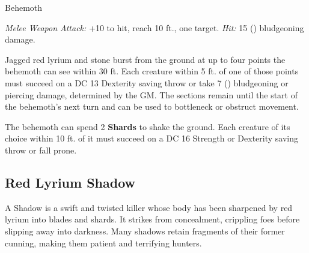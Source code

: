 \begin{monsterbox}{Behemoth}

\begin{rpg-monsteraction}[Bash]
\textit{Melee Weapon Attack:} +10 to hit, reach 10 ft., one target. \textit{Hit:} 15 () bludgeoning damage.
\end{rpg-monsteraction}

\begin{rpg-monsteraction}
Jagged red lyrium and stone burst from the ground at up to four points the behemoth can see within 30 ft. Each creature within 5 ft. of one of those points must succeed on a DC 13 Dexterity saving throw or take 7 () bludgeoning or piercing damage, determined by the GM. The sections remain until the start of the behemoth's next turn and can be used to bottleneck or obstruct movement.
\end{rpg-monsteraction}


\begin{rpg-monsteraction}[Quake]
The behemoth can spend 2 \textbf{Shards} to shake the ground. Each creature of its choice within 10 ft. of it must succeed on a DC 16 Strength or Dexterity saving throw or fall prone.
\end{rpg-monsteraction}

\end{monsterbox}

\newpage

\subsection{Red Lyrium Shadow}

A Shadow is a swift and twisted killer whose body has been sharpened by red lyrium into blades and shards. It strikes from concealment, crippling foes before slipping away into darkness. Many shadows retain fragments of their former cunning, making them patient and terrifying hunters.

